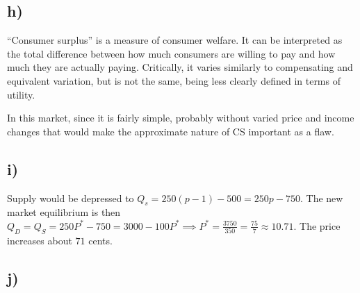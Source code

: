 \documentclass[12pt,letterpaper]{article}
\theoremstyle{definition}
\begin{document}
\begin{center}
\end{center}

\subsection*{h)}

``Consumer surplus'' is a measure of consumer welfare. It can be interpreted as
the total difference between how much consumers are willing to pay and how much they
are actually paying. Critically, it varies similarly to compensating and
equivalent variation, but is not the same, being less clearly defined in terms
of utility.

In this market, since it is fairly simple, probably without varied price and
income changes that would make the approximate nature of CS important as a flaw.

\subsection*{i)}

Supply would be depressed to $Q_s = 250(p - 1) - 500 = 250p - 750$. The new
market equilibrium is then $Q_D = Q_S = 250P^* - 750 = 3000 - 100P^* \implies
P^* = \frac{3750}{350} = \frac{75}{7} \approx 10.71$. The price increases about
$71$ cents.

\subsection*{j)}
\end{document}
